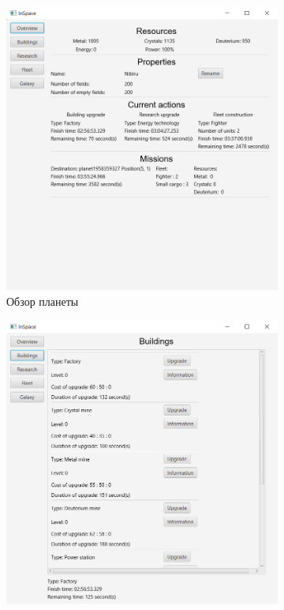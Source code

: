 \begin{figure}[H]
\centering
\begin{subfigure}[b]{0.4\textwidth} 
\includegraphics[width=1\textwidth]{../screenshots/1.png}
\caption{Обзор планеты}
\end{subfigure}
\begin{subfigure}[b]{0.4\textwidth} 
\includegraphics[width=1\textwidth]{../screenshots/2.png}

\end{subfigure}
\end{figure}
